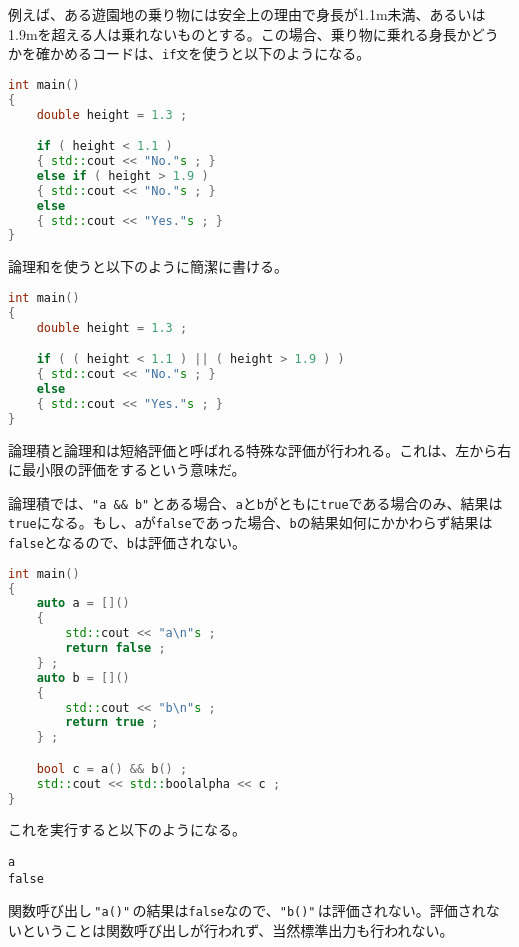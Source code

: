 例えば、ある遊園地の乗り物には安全上の理由で身長が1.1m未満、あるいは1.9mを超える人は乗れないものとする。この場合、乗り物に乗れる身長かどうかを確かめるコードは、\texttt{if文}を使うと以下のようになる。

\begin{lstlisting}[language={C++}]
int main()
{
    double height = 1.3 ;

    if ( height < 1.1 )
    { std::cout << "No."s ; }
    else if ( height > 1.9 )
    { std::cout << "No."s ; }
    else
    { std::cout << "Yes."s ; }
}
\end{lstlisting}

論理和を使うと以下のように簡潔に書ける。

\begin{lstlisting}[language={C++}]
int main()
{
    double height = 1.3 ;

    if ( ( height < 1.1 ) || ( height > 1.9 ) )
    { std::cout << "No."s ; }
    else
    { std::cout << "Yes."s ; }
}
\end{lstlisting}


論理積と論理和は短絡評価と呼ばれる特殊な評価が行われる。これは、左から右に最小限の評価をするという意味だ。

論理積では、\texttt{"a \&\& b"}\,とある場合、\texttt{a}と\texttt{b}がともに\texttt{true}である場合のみ、結果は\texttt{true}になる。もし、\texttt{a}が\texttt{false}であった場合、\texttt{b}の結果如何にかかわらず結果は\texttt{false}となるので、\texttt{b}は評価されない。

\begin{lstlisting}[language={C++}]
int main()
{
    auto a = []()
    {
        std::cout << "a\n"s ;
        return false ;
    } ;
    auto b = []()
    {
        std::cout << "b\n"s ;
        return true ;
    } ;

    bool c = a() && b() ;
    std::cout << std::boolalpha << c ; 
}
\end{lstlisting}

これを実行すると以下のようになる。

\begin{lstlisting}[style=terminal]
a
false
\end{lstlisting}

関数呼び出し\,\texttt{"a()"}\,の結果は\texttt{false}なので、\texttt{"b()"}\,は評価されない。評価されないということは関数呼び出しが行われず、当然標準出力も行われない。

